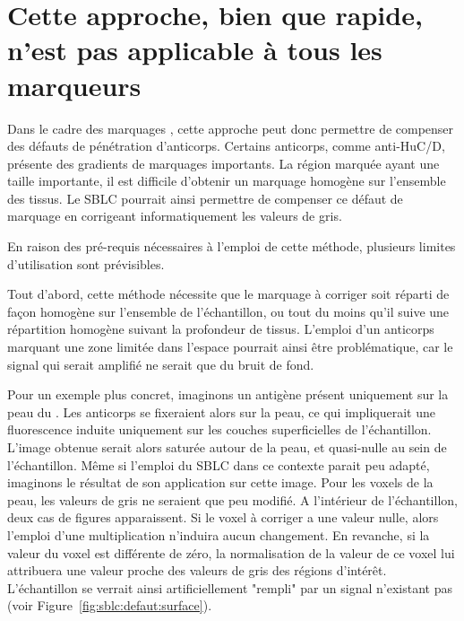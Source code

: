 \documentclass[\main/main.tex]{subfiles}
\begin{document}
    \section{Cette approche, bien que rapide, n'est pas applicable à tous les marqueurs}
    

%
Dans le cadre des marquages \ihc{}, cette approche peut donc permettre de compenser des défauts de pénétration d'anticorps.
%
Certains anticorps, comme anti-HuC/D, présente des gradients de marquages importants.
%
La région marquée ayant une taille importante, il est difficile d'obtenir un marquage homogène sur l'ensemble des tissus.
%
Le SBLC pourrait ainsi permettre de compenser ce défaut de marquage en corrigeant informatiquement les valeurs de gris.

%
En raison des pré-requis nécessaires à l'emploi de cette méthode, plusieurs limites d'utilisation sont prévisibles.

%
Tout d'abord, cette méthode nécessite que le marquage à corriger soit réparti de façon homogène sur l'ensemble de l'échantillon, ou tout du moins qu'il suive une répartition homogène suivant la profondeur de tissus.
%
L'emploi d'un anticorps marquant une zone limitée dans l'espace pourrait ainsi être problématique, car le signal qui serait amplifié ne serait que du bruit de fond.

%
Pour un exemple plus concret, imaginons un antigène présent uniquement sur la peau du \pz{}.
%
Les anticorps se fixeraient alors sur la peau, ce qui impliquerait une fluorescence induite uniquement sur les couches superficielles de l'échantillon.
%
L'image obtenue serait alors saturée autour de la peau, et quasi-nulle au sein de l'échantillon.
%
Même si l'emploi du SBLC dans ce contexte parait peu adapté, imaginons le résultat de son application sur cette image.
%
Pour les voxels de la peau, les valeurs de gris ne seraient que peu modifié.
%
A l'intérieur de l'échantillon, deux cas de figures apparaissent.
%
Si le voxel à corriger a une valeur nulle, alors l'emploi d'une multiplication n'induira aucun changement.
%
En revanche, si la valeur du voxel est différente de zéro, la normalisation de la valeur de ce voxel lui attribuera une valeur proche des valeurs de gris des régions d'intérêt.
%
L'échantillon se verrait ainsi artificiellement "rempli" par un signal n'existant pas (voir Figure~\ref{fig:sblc:defaut:surface}).
\end{document}
